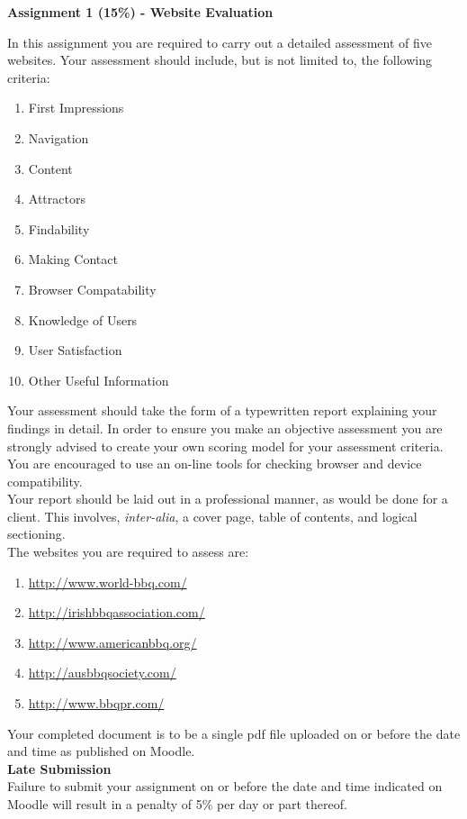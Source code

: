 
	
\begin{flushleft}
\Large\textbf{Assignment 1 (15\%) - Website Evaluation}\\
\end{flushleft}

In this assignment you are required to carry out a detailed assessment of five websites. Your assessment should include, but is not limited to, the following criteria:


\begin{enumerate}
	\item First Impressions
	\item Navigation
	\item Content
	\item Attractors
	\item Findability
	\item Making Contact
	\item Browser Compatability
	\item Knowledge of Users
	\item User Satisfaction
	\item Other Useful Information
\end{enumerate}

Your assessment should take the form of a typewritten report explaining your findings in detail. In order to ensure you make an objective assessment you are strongly advised to create your own scoring model for your assessment criteria. You are encouraged to use an on-line tools for checking browser and device compatibility.\\

Your report should be laid out in a professional manner, as would be done for a client. This involves, \textit{inter-alia}, a cover page, table of contents, and logical sectioning.\\

The websites you are required to assess are:\\

\begin{enumerate}
	\item \href{http://www.world-bbq.com/}{http://www.world-bbq.com/}
	\item \href{http://irishbbqassociation.com/}{http://irishbbqassociation.com/}
	\item \href{http://www.americanbbq.org/}{http://www.americanbbq.org/}
	\item \href{http://ausbbqsociety.com/}{http://ausbbqsociety.com/}
	\item \href{http://www.bbqpr.com/}{http://www.bbqpr.com/}
\end{enumerate}

Your completed document is to be a single pdf file uploaded on or before the date and time as published on Moodle.\\

\textbf{Late Submission}\\
Failure to submit your assignment on or before the date and time indicated on Moodle will result in a penalty of 5\% per day or part thereof.  


